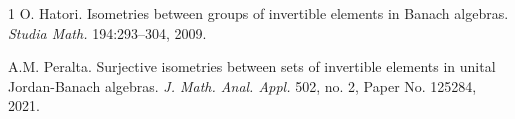 \documentclass[a4paper]{amsart}
\begin{document}
%
%
%
%

\begin{thebibliography}{1}
 O. Hatori.  
\newblock Isometries between groups of invertible elements in Banach algebras. 
\newblock \emph{Studia Math.} {194}:293--304, 2009.

 A.M. Peralta. 
\newblock Surjective isometries between sets of invertible elements in unital Jordan-Banach algebras. 
\newblock \emph{J. Math. Anal. Appl.} 502, no. 2, Paper No. 125284, 2021.


\end{thebibliography}
\end{document}
